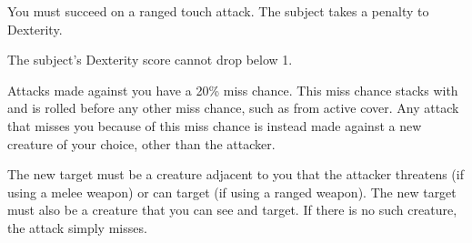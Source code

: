 \spellrng{\rngclose}
\spelldur{\durshort}
\begin{spelleffect}
  You must succeed on a ranged touch attack. The subject takes a  penalty to Dexterity.
\end{spelleffect}
\begin{spellnotes}
  The subject's Dexterity score cannot drop below 1.
\end{spellnotes}

\begin{spelleffect}
  Attacks made against you have a 20\% miss chance. This miss chance stacks with and is rolled before any other miss chance, such as from active cover. Any attack that misses you because of this miss chance is instead made against a new creature of your choice, other than the attacker.
  \par The new target must be a creature adjacent to you that the attacker threatens (if using a melee weapon) or can target (if using a ranged weapon). The new target must also be a creature that you can see and target. If there is no such creature, the attack simply misses.
\end{spelleffect}

